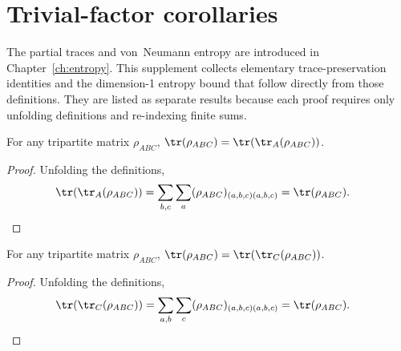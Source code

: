 
\section{Trivial-factor corollaries}

The partial traces and von~Neumann entropy are introduced in
Chapter~\ref{ch:entropy}. This supplement collects elementary
trace-preservation identities and the dimension-1 entropy bound that
follow directly from those definitions. They are listed as separate
results because each proof requires only unfolding definitions and
re-indexing finite sums.



\begin{theorem}
    \label{thm:trace_tracea_abc}
    \leanok
    For any tripartite matrix $\rho_{ABC}$,
    $\tr(\rho_{ABC})=\tr(\tr_A(\rho_{ABC}))$.
\end{theorem}

\begin{proof}\leanok
    Unfolding the definitions,
    \begin{align}
        \tr(\tr_A(\rho_{ABC}))
        &= \sum_{b,c}\sum_a
        (\rho_{ABC})_{(a,b,c)(a,b,c)}
        = \tr(\rho_{ABC}).
        \notag
    \end{align}
\end{proof}


\begin{theorem}
    \label{thm:trace_tracec_abc}
    \leanok
    For any tripartite matrix $\rho_{ABC}$,
    $\tr(\rho_{ABC})=\tr(\tr_C(\rho_{ABC}))$.
\end{theorem}

\begin{proof}\leanok
    Unfolding the definitions,
    \begin{align}
        \tr(\tr_C(\rho_{ABC}))
        &= \sum_{a,b}\sum_c
        (\rho_{ABC})_{(a,b,c)(a,b,c)}
        = \tr(\rho_{ABC}).
        \notag
    \end{align}
\end{proof}


